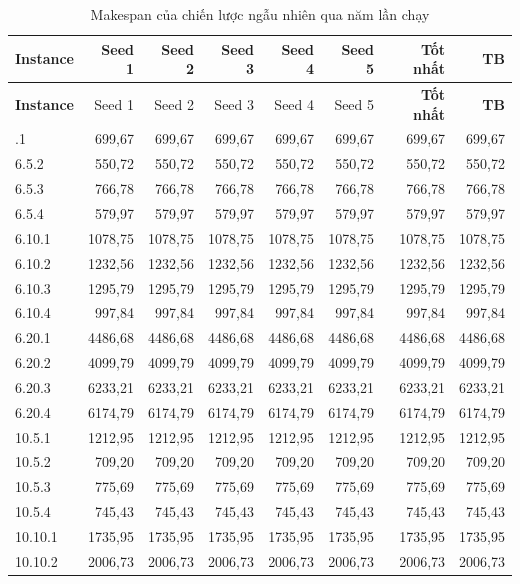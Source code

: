 \documentclass[../DoAn.tex]{subfiles}
\begin{document}
\begin{small}
\begin{longtable}{l|rrrrr|rr}
\caption{Makespan của chiến lược ngẫu nhiên qua năm lần chạy}\label{tab:appA_rnd}\\
\toprule
\textbf{Instance} & Seed 1 & Seed 2 & Seed 3 & Seed 4 & Seed 5 & \textbf{Tốt nhất} & \textbf{TB} \\
\midrule
\endfirsthead
\toprule
\textbf{Instance} & Seed 1 & Seed 2 & Seed 3 & Seed 4 & Seed 5 & \textbf{Tốt nhất} & \textbf{TB} \\
\midrule
\endhead
\bottomrule
\endfoot
6.5.1 & 699,67 & 699,67 & 699,67 & 699,67 & 699,67 & 699,67 & 699,67 \\
6.5.2 & 550,72 & 550,72 & 550,72 & 550,72 & 550,72 & 550,72 & 550,72 \\
6.5.3 & 766,78 & 766,78 & 766,78 & 766,78 & 766,78 & 766,78 & 766,78 \\
6.5.4 & 579,97 & 579,97 & 579,97 & 579,97 & 579,97 & 579,97 & 579,97 \\
6.10.1 & 1078,75 & 1078,75 & 1078,75 & 1078,75 & 1078,75 & 1078,75 & 1078,75 \\
6.10.2 & 1232,56 & 1232,56 & 1232,56 & 1232,56 & 1232,56 & 1232,56 & 1232,56 \\
6.10.3 & 1295,79 & 1295,79 & 1295,79 & 1295,79 & 1295,79 & 1295,79 & 1295,79 \\
6.10.4 & 997,84 & 997,84 & 997,84 & 997,84 & 997,84 & 997,84 & 997,84 \\
6.20.1 & 4486,68 & 4486,68 & 4486,68 & 4486,68 & 4486,68 & 4486,68 & 4486,68 \\
6.20.2 & 4099,79 & 4099,79 & 4099,79 & 4099,79 & 4099,79 & 4099,79 & 4099,79 \\
6.20.3 & 6233,21 & 6233,21 & 6233,21 & 6233,21 & 6233,21 & 6233,21 & 6233,21 \\
6.20.4 & 6174,79 & 6174,79 & 6174,79 & 6174,79 & 6174,79 & 6174,79 & 6174,79 \\
10.5.1 & 1212,95 & 1212,95 & 1212,95 & 1212,95 & 1212,95 & 1212,95 & 1212,95 \\
10.5.2 & 709,20 & 709,20 & 709,20 & 709,20 & 709,20 & 709,20 & 709,20 \\
10.5.3 & 775,69 & 775,69 & 775,69 & 775,69 & 775,69 & 775,69 & 775,69 \\
10.5.4 & 745,43 & 745,43 & 745,43 & 745,43 & 745,43 & 745,43 & 745,43 \\
10.10.1 & 1735,95 & 1735,95 & 1735,95 & 1735,95 & 1735,95 & 1735,95 & 1735,95 \\
10.10.2 & 2006,73 & 2006,73 & 2006,73 & 2006,73 & 2006,73 & 2006,73 & 2006,73 \\

\end{longtable}
\end{small}
\end{document}
